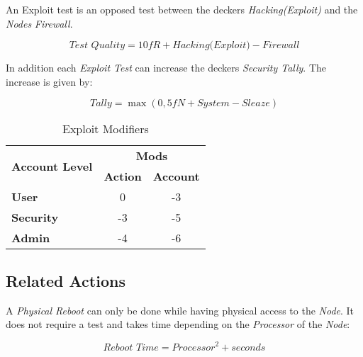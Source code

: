 An Exploit test is an opposed test between the deckers \emph{Hacking(Exploit)} and
the \emph{Nodes} \emph{Firewall}.

\begin{equation*}
    \textit{Test Quality} = \textit{10fR} + \textit{Hacking(Exploit)} - \textit{Firewall}
\end{equation*}

In addition each \emph{Exploit Test} can increase the deckers \emph{Security Tally}.
The increase is given by:

\begin{equation*}
    \textit{Tally} = \max(0, \textit{5fN} + \textit{System} - \textit{Sleaze})
\end{equation*}

\begin{table}[htb]
    \caption[Exploit Modifiers]{Exploit Modifiers}
    \label{tab:exploit mods}
    \centering
    \begin{tabular}{lcc}
        \toprule
        \multirow{2}{*}{\textbf{Account Level}} & \multicolumn{2}{c}{\textbf{Mods}}                    \\
        \cmidrule{2-3}
        {}                                      & \textbf{Action}                   & \textbf{Account} \\
        \midrule
        \textbf{User}                           & 0                                 & -3               \\
        \textbf{Security}                       & -3                                & -5               \\
        \textbf{Admin}                          & -4                                & -6               \\
        \bottomrule
    \end{tabular}
\end{table}

\subsection{Related Actions}


A \emph{Physical Reboot} can only be done while having physical access to the
\emph{Node}. It does not require a test and takes time depending on the
\emph{Processor} of the \emph{Node}:

\begin{equation*}
    \textit{Reboot Time} = \textit{Processor}^2 + \textit{seconds}
\end{equation*}

